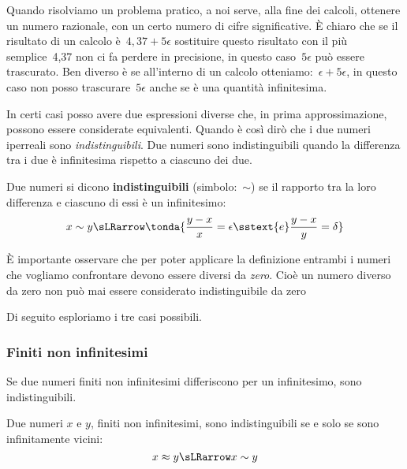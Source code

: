 Quando risolviamo un problema pratico, a noi serve, alla fine dei calcoli, 
ottenere un numero razionale, con un certo numero di cifre significative.
È chiaro che se il risultato di un calcolo è~\(4,37+5\epsilon\) sostituire 
questo risultato con il più semplice~4,37 non ci fa perdere in precisione, 
in questo caso~\(5\epsilon\) può essere trascurato.
Ben diverso è se all'interno di un calcolo  
otteniamo:~\(\epsilon+5\epsilon\), in questo caso non posso 
trascurare~\(5\epsilon\) anche se è una quantità infinitesima. 

In certi casi posso avere due espressioni diverse che, in prima 
approssimazione, possono essere considerate equivalenti. Quando è così dirò 
che i due numeri iperreali sono \emph{indistinguibili}.
Due numeri sono indistinguibili quando la differenza tra i due è 
infinitesima rispetto a ciascuno dei due.

\begin{definizione}
Due numeri si dicono \textbf{indistinguibili} (simbolo:~\(\sim\)) se il 
rapporto tra la loro differenza e ciascuno di essi è un infinitesimo:
\[x \sim y \sLRarrow 
\tonda{\frac{y-x}{x} = \epsilon \sstext{e} \frac{y-x}{y} = \delta}
\]
\end{definizione}

\begin{osservazione}
 È importante osservare che per poter applicare la definizione entrambi i 
numeri che vogliamo confrontare devono essere diversi da \emph{zero}.
Cioè un numero diverso da zero non può mai essere considerato 
indistinguibile da zero
\end{osservazione}

Di seguito esploriamo i tre casi possibili.

\subsubsection{Finiti non infinitesimi}
\label{subsubsec:insnum_finitini}

Se due numeri finiti non infinitesimi differiscono per un 
infinitesimo, sono indistinguibili.

\begin{teorema}
Due numeri \(x\) e \(y\), finiti non infinitesimi, 
sono indistinguibili se e solo se sono infinitamente vicini:
\[x \approx y \sLRarrow x \sim y\]
\end{teorema}

